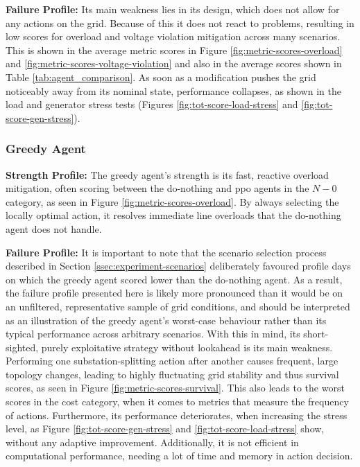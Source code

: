 \textbf{Failure Profile:} Its main weakness lies in its design, which does not allow for any actions on the grid. Because of this it does not react to problems, resulting in low scores for overload and voltage violation mitigation across many scenarios. This is shown in the average metric scores in Figure \ref{fig:metric-scores-overload} and \ref{fig:metric-scores-voltage-violation} and also in the average scores shown in Table \ref{tab:agent_comparison}. As soon as a modification pushes the grid noticeably away from its nominal state, performance collapses, as shown in the load and generator stress tests (Figures \ref{fig:tot-score-load-stress} and \ref{fig:tot-score-gen-stress}).

\subsubsection{Greedy Agent}
\textbf{Strength Profile:} The greedy agent's strength is its fast, reactive overload mitigation, often scoring between the do-nothing and \ac{ppo} agents in the $N-0$ category, as seen in Figure \ref{fig:metric-scores-overload}. By always selecting the locally optimal action, it resolves immediate line overloads that the do-nothing agent does not handle.

\textbf{Failure Profile:} It is important to note that the scenario selection process described in Section \ref{ssec:experiment-scenarios} deliberately favoured profile days on which the greedy agent scored lower than the do-nothing agent. As a result, the failure profile presented here is likely more pronounced than it would be on an unfiltered, representative sample of grid conditions, and should be interpreted as an illustration of the greedy agent's worst-case behaviour rather than its typical performance across arbitrary scenarios. 
With this in mind, its short-sighted, purely exploitative strategy without lookahead is its main weakness. Performing one substation-splitting action after another causes frequent, large topology changes, leading to highly fluctuating grid stability and thus survival scores, as seen in Figure \ref{fig:metric-scores-survival}. This also leads to the worst scores in the cost category, when it comes to metrics that measure the frequency of actions. Furthermore, its performance deteriorates, when increasing the stress level, as Figure \ref{fig:tot-score-gen-stress} and \ref{fig:tot-score-load-stress} show, without any adaptive improvement. Additionally, it is not efficient in computational performance, needing a lot of time and memory in action decision. 

